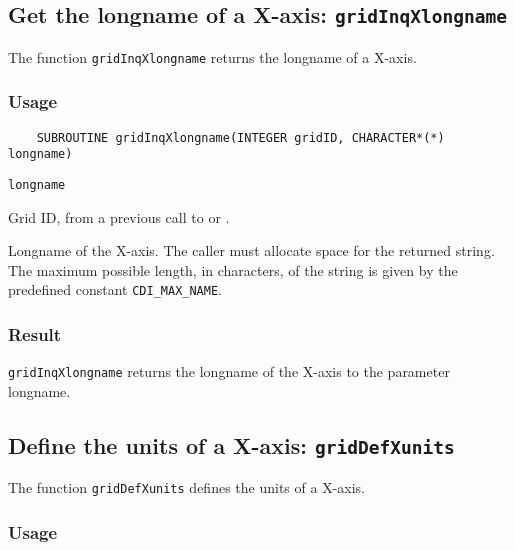 \subsection{Get the longname of a X-axis: {\tt gridInqXlongname}}
\label{gridInqXlongname}

The function {\tt gridInqXlongname} returns the longname of a X-axis.

\subsubsection*{Usage}

\begin{verbatim}
    SUBROUTINE gridInqXlongname(INTEGER gridID, CHARACTER*(*) longname)
\end{verbatim}

\hspace*{4mm}\begin{minipage}[]{15cm}
\begin{deflist}{\tt longname\ }
\item[{\tt gridID}]
Grid ID, from a previous call to {} or {}.
\item[{\tt longname}]
Longname of the X-axis. The caller must allocate space for the
                    returned string. The maximum possible length, in characters, of
                    the string is given by the predefined constant {\tt CDI\_MAX\_NAME}.

\end{deflist}
\end{minipage}

\subsubsection*{Result}

{\tt gridInqXlongname} returns the longname of the X-axis to the parameter longname.



\subsection{Define the units of a X-axis: {\tt gridDefXunits}}
\label{gridDefXunits}

The function {\tt gridDefXunits} defines the units of a X-axis.

\subsubsection*{Usage}

